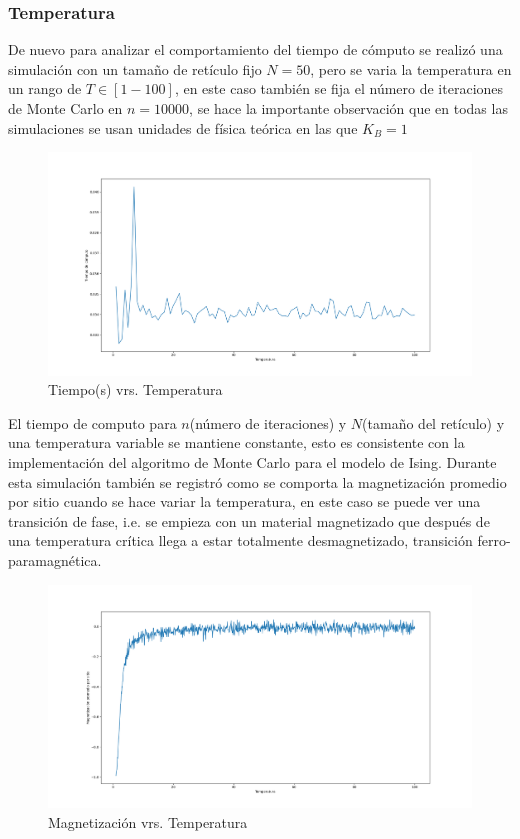 \documentclass[a4paper]{article}
\begin{document}
\subsubsection{Temperatura}
De nuevo para analizar el comportamiento del tiempo de cómputo se realizó una simulación con un tamaño de retículo fijo $N=50$, pero se varia la temperatura en un rango de $T\in[1-100]$, en este caso también se fija el número de iteraciones de Monte Carlo en $n=10000$, se hace la importante observación que en todas las simulaciones se usan unidades de física teórica en las que $K_B=1$
\begin{figure}[H]
\begin{center}
\includegraphics[scale=0.3]{time_vrs_T.png} 
\end{center} 
\caption{Tiempo(s) vrs. Temperatura}
\end{figure}
El tiempo de computo para $n$(número de iteraciones) y $N$(tamaño del retículo) y una temperatura variable se mantiene constante, esto es consistente con la implementación del algoritmo de Monte Carlo para el modelo de Ising.
Durante esta simulación también se registró como se comporta la magnetización promedio por sitio cuando se hace variar la temperatura, en este caso se puede ver una transición de fase, i.e. se empieza con un material magnetizado que después de una temperatura crítica llega a estar totalmente desmagnetizado, transición ferro-paramagnética.
\begin{figure}[H]
\begin{center}
\includegraphics[scale=0.3]{M_vrs_T.png} 
\end{center} 
\caption{Magnetización vrs. Temperatura}
\end{figure}
\end{document}
